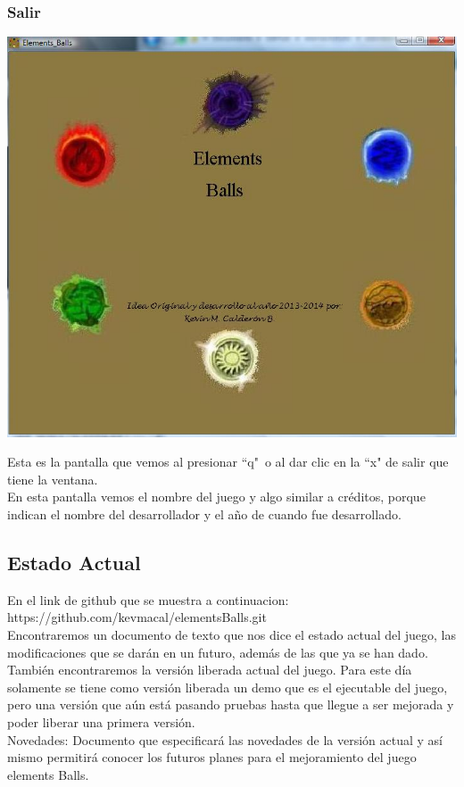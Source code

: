 \documentclass[10pt]{article}
\begin{document}
{\begin{flushleft}
\subsubsection{Salir}
\begin{center}
\includegraphics[scale=0.7]{salir1}
\end{center}
Esta es la pantalla que vemos al presionar ``q"\ o al dar clic en la ``x" de salir que tiene la ventana.\\
En esta pantalla vemos el nombre del juego y algo similar a cr\'editos, porque indican el nombre del desarrollador y el a\~no de cuando fue desarrollado.

\newpage
\subsection{Estado Actual}
En el link de github que se muestra a continuacion:\\\vspace{0.1in}\hspace{0.5in}https://github.com/kevmacal/elementsBalls.git\\\vspace{0.1in}
Encontraremos un documento de texto que nos dice el estado actual del juego, las modificaciones que se dar\'an en un futuro, adem\'as de las que ya se han dado.\\
Tambi\'en encontraremos la versi\'on liberada actual del juego. Para este d\'ia solamente se tiene como versi\'on liberada un demo que es el ejecutable del juego, pero una versi\'on que a\'un est\'a pasando pruebas hasta que llegue a ser mejorada y poder liberar una primera versi\'on.\\\vspace{0.1in}
Novedades: Documento que especificar\'a las novedades de la versi\'on actual y as\'i mismo permitir\'a conocer los futuros planes
para el mejoramiento del juego elements Balls.


\end{flushleft}}
\end{document}
